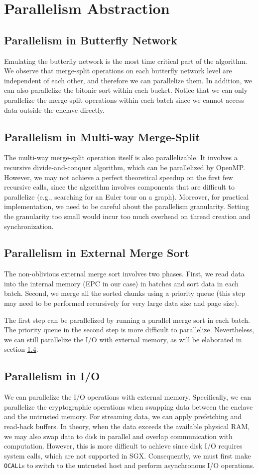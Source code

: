 \documentclass{article}
\begin{document}
\section{Parallelism Abstraction}
\subsection{Parallelism in Butterfly Network}
Emulating the butterfly network is the most time critical part of the algorithm. We observe that merge-split operations on each butterfly network level are independent of each other, and therefore we can parallelize them. In addition, we can also parallelize the bitonic sort within each bucket. Notice that we can only parallelize the merge-split operations within each batch since we cannot access data outside the enclave directly.
\subsection{Parallelism in Multi-way Merge-Split}
The multi-way merge-split operation itself is also parallelizable. It involves a recursive divide-and-conquer algorithm, which can be parallelized by OpenMP. However, we may not achieve a perfect theoretical speedup on the first few recursive calls, since the algorithm involves components that are difficult to parallelize (e.g., searching for an Euler tour on a graph). Moreover, for practical implementation, we need to be careful about the parallelism granularity. Setting the granularity too small would incur too much overhead on thread creation and synchronization.
\subsection{Parallelism in External Merge Sort}
The non-oblivious external merge sort involves two phases. First, we read data into the internal memory (EPC in our case) in batches and sort data in each batch. Second, we merge all the sorted chunks using a priority queue (this step may need to be performed recursively for very large data size and page size).

The first step can be parallelized by running a parallel merge sort in each batch. The priority queue in the second step is more difficult to parallelize. Nevertheless, we can still parallelize the I/O with external memory, as will be elaborated in section \ref{sec:parallelize I/O}.

\subsection{Parallelism in I/O}
\label{sec:parallelize I/O}
We can parallelize the I/O operations with external memory. Specifically, we can parallelize the cryptographic operations when swapping data between the enclave and the untrusted memory. For streaming data, we can apply prefetching and read-back buffers. In theory, when the data exceeds the available physical RAM, we may also swap data to disk in parallel and overlap communication with computation. However, this is more difficult to achieve since disk I/O requires system calls, which are not supported in SGX. Consequently, we must first make {\tt OCALL}s to switch to the untrusted host and perform asynchronous I/O operations.
\end{document}
